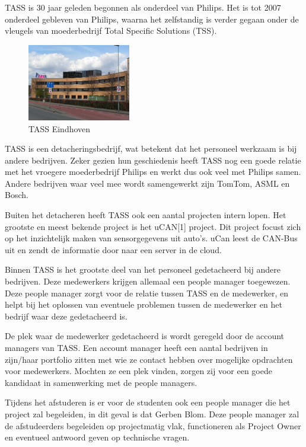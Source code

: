 \documentclass[]{article}
\begin{document}
TASS is 30 jaar geleden begonnen als onderdeel van Philips. Het is tot 2007
onderdeel gebleven van Philips, waarna het zelfstandig is verder gegaan
onder de vleugels van moederbedrijf Total Specific Solutions (TSS).

\begin{figure}
  \begin{center}
    \includegraphics[width=0.40\textwidth]{tass_eindhoven.pdf}
  \end{center}
  \caption{TASS Eindhoven}
\end{figure}

TASS is een detacheringsbedrijf, wat betekent dat het personeel werkzaam is bij
andere bedrijven. Zeker gezien hun geschiedenis heeft TASS nog een goede
relatie met het vroegere moederbedrijf Philips en werkt dus ook veel met Philips
samen. Andere bedrijven waar veel mee wordt samengewerkt zijn TomTom, ASML
en Bosch.

Buiten het detacheren heeft TASS ook een aantal projecten intern lopen. Het
grootste en meest bekende project is het uCAN[1] project. Dit project
focust zich op het inzichtelijk maken van sensorgegevens uit auto's. uCan
leest de CAN-Bus uit en zendt de informatie door naar een server in de
cloud.

Binnen TASS is het grootste deel van het personeel gedetacheerd bij andere
bedrijven. Deze medewerkers krijgen allemaal een people manager toegewezen.
Deze people manager zorgt voor de relatie tussen TASS en de medewerker, en helpt 
bij het oplossen van eventuele problemen tussen de medewerker en het bedrijf waar deze
gedetacheerd is.

De plek waar de medewerker gedetacheerd is wordt geregeld door de account
managers van TASS. Een account manager heeft een aantal bedrijven in
zijn/haar portfolio zitten met wie ze contact hebben over mogelijke
opdrachten voor medewerkers. Mochten ze een plek vinden, zorgen zij voor
een goede kandidaat in samenwerking met de people managers.

Tijdens het afstuderen is er voor de studenten ook een people manager
die het project zal begeleiden, in dit geval is dat Gerben Blom. Deze
people manager zal de afstudeerders begeleiden op projectmatig vlak,
functioneren als Project Owner en eventueel antwoord geven op technische
vragen.
\end{document}
